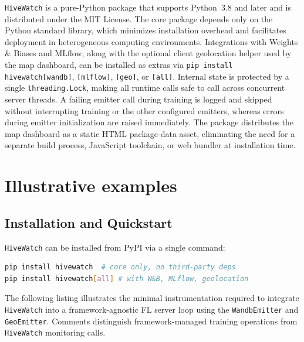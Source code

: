 \documentclass[preprint,12pt, a4paper]{elsarticle}
\newcommand{\rev}[1]{{\color{blue}#1}}
\newcommand{\rev}[1]{#1}
\begin{document}
\texttt{HiveWatch} is a pure-Python package that supports Python~3.8 and later and is distributed  under the MIT License. The core package depends only on the Python standard library, which minimizes installation overhead and facilitates deployment in heterogeneous computing environments. Integrations with Weights \& Biases and MLflow, along with the optional client geolocation helper used by the map dashboard, can be installed as extras via \texttt{pip install hivewatch[wandb]}, \texttt{[mlflow]}, \texttt{[geo]}, or \texttt{[all]}. Internal state is protected by a single \texttt{threading.Lock}, making \rev{all runtime calls} safe to call across concurrent server threads. \rev{A failing emitter call during training is logged and skipped without interrupting training or the other configured emitters, whereas errors during emitter initialization are raised immediately.} The package distributes the map dashboard as a static HTML package-data asset, eliminating the need for a separate build process, JavaScript toolchain, or web bundler at installation time.


\section{Illustrative examples}
\label{sec:illustrative}

\subsection{Installation and Quickstart}

\texttt{HiveWatch} can be installed from PyPI via a single command:

\begin{lstlisting}[style=PythonStyle,language=bash,caption={Installation command for \texttt{HiveWatch}.}]
pip install hivewatch  # core only, no third-party deps
pip install hivewatch[all] # with W&B, MLflow, geolocation
\end{lstlisting}

The following listing illustrates the minimal instrumentation required to integrate \texttt{HiveWatch} into a framework-agnostic FL server loop using the \texttt{WandbEmitter} and \texttt{GeoEmitter}. Comments distinguish framework-managed training operations from \texttt{HiveWatch} monitoring calls.
\end{document}

